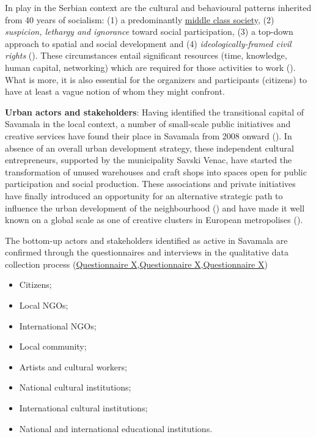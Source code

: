 \documentclass[11pt]{report}
\begin{document}
\begin{itemize}
In play in the Serbian context are the cultural and behavioural patterns inherited from 40 years of socialism: (1) a predominantly  \underline{middle class society},
(2) \textit{suspicion, lethargy and ignorance} toward social participation,
(3) a top-down approach to spatial and social development and
(4) \textit{ideologically-framed civil rights} (\href{Bolay}{\citealt{bolay_instrumental_2014}}).
These circumstances entail significant resources (time, knowledge, human capital, networking) which are required  for those activities to work (\href{ref}{\citealt{ministarstvo_prostora_urbani_2014}}).
What is more, it is also essential for the organizers and participants (citizens) to have at least a vague notion of whom they might confront.

\textbf{Urban actors and stakeholders}:
Having identified the transitional capital of Savamala in the local context, a number of small-scale public initiatives and creative services have found their place in Savamala from 2008 onward (\href{Cvetinovic}{\citealt{cvetinovic_engine_2013}}).
In absence of an overall urban development strategy, these independent cultural entrepreneurs, supported by the municipality Savski Venac, have started the  transformation  of unused warehouses and craft shops into spaces open for public participation and social production. These associations and private initiatives have finally introduced an opportunity for an alternative strategic path to influence the urban development of the neighbourhood (\href{Mikser}{\citealt{mikser_festival_mikser_2012}}) and have made it well known on a global scale as one of creative clusters in European metropolises  (\cite{ref Monocle, Gardian?}).

The bottom-up actors and stakeholders identified as active in Savamala are confirmed through the questionnaires and interviews in the qualitative data collection process (\href{Questionnaire Experts Post-socialist}{Questionnaire X},\href{Questionnaire Experts Savamala}{Questionnaire X},\href{Questionnaire Students Savamala}{Questionnaire X})

\begin{itemize}
\item Citizens;
\item Local NGOs;
\item International NGOs;
\item Local community;
\item Artists and cultural workers;
\item National cultural institutions;
\item International cultural institutions;
\item National and international educational institutions.
\end{itemize}


\end{itemize}
\end{document}
